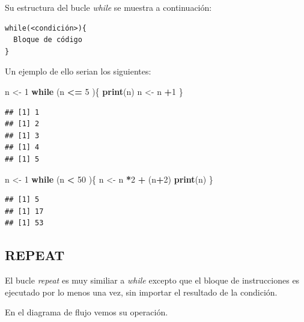 \documentclass[11pt,]{article}
\newenvironment{Shaded}{\begin{snugshade}}{\end{snugshade}}
\newcommand{\ControlFlowTok}[1]{\textcolor[rgb]{0.13,0.29,0.53}{\textbf{#1}}}
\newcommand{\DecValTok}[1]{\textcolor[rgb]{0.00,0.00,0.81}{#1}}
\newcommand{\KeywordTok}[1]{\textcolor[rgb]{0.13,0.29,0.53}{\textbf{#1}}}
\newcommand{\NormalTok}[1]{#1}
\newcommand{\OperatorTok}[1]{\textcolor[rgb]{0.81,0.36,0.00}{\textbf{#1}}}
\newcommand{\StringTok}[1]{\textcolor[rgb]{0.31,0.60,0.02}{#1}}
\begin{document}
Su estructura del bucle \emph{while} se muestra a continuación:

\begin{verbatim}
while(<condición>){
  Bloque de código
}
\end{verbatim}

Un ejemplo de ello serian los siguientes:

\begin{Shaded}
\begin{Highlighting}[]
\NormalTok{n <-}\StringTok{ }\DecValTok{1}
\ControlFlowTok{while}\NormalTok{ (n }\OperatorTok{<=}\StringTok{ }\DecValTok{5}\NormalTok{ )\{}
  \KeywordTok{print}\NormalTok{(n)}
\NormalTok{  n <-}\StringTok{ }\NormalTok{n }\OperatorTok{+}\DecValTok{1}
\NormalTok{\}}
\end{Highlighting}
\end{Shaded}

\begin{verbatim}
## [1] 1
## [1] 2
## [1] 3
## [1] 4
## [1] 5
\end{verbatim}

\begin{Shaded}
\begin{Highlighting}[]
\NormalTok{n <-}\StringTok{ }\DecValTok{1}
\ControlFlowTok{while}\NormalTok{ (n }\OperatorTok{<}\StringTok{ }\DecValTok{50}\NormalTok{ )\{}
\NormalTok{  n <-}\StringTok{ }\NormalTok{n }\OperatorTok{*}\DecValTok{2} \OperatorTok{+}\StringTok{ }\NormalTok{(n}\OperatorTok{+}\DecValTok{2}\NormalTok{)}
  \KeywordTok{print}\NormalTok{(n)}
\NormalTok{\}}
\end{Highlighting}
\end{Shaded}

\begin{verbatim}
## [1] 5
## [1] 17
## [1] 53
\end{verbatim}

\hypertarget{repeat}{%
\subsection{REPEAT}\label{repeat}}

El bucle \emph{repeat} es muy similiar a \emph{while} excepto que el
bloque de instrucciones es ejecutado por lo menos una vez, sin importar
el resultado de la condición.

En el diagrama de flujo vemos su operación.
\end{document}
